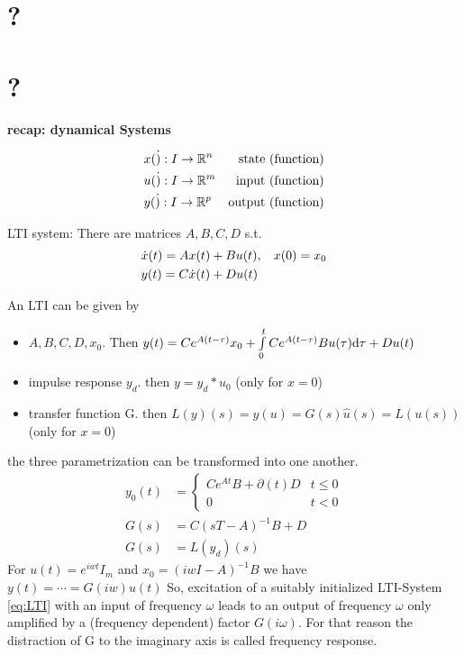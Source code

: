 \section{?}

\section{?}

\textbf{recap: dynamical Systems }

\begin{align*}
		& x(\dot ) : I \rightarrow \mathbb{R}^n & \text{state (function)}\\
		& u(\dot ) : I \rightarrow \mathbb{R}^m & \text{input (function)}\\
		& y(\dot ) : I \rightarrow \mathbb{R}^p & \text{output (function)}
\end{align*}

LTI system: There are matrices $A,B,C,D$ s.t. 
\begin{align}
	\label{eq:LTI}
	& \dot{x}(t)=A x(t) + B u(t), \hspace{2ex} x(0)=x_0\\
	& y(t)=C \dot{x}(t) + D u(t)
\end{align}


An LTI can be given by
\begin{itemize}
	\item  $A,B,C,D, x_0$. Then $y(t)= C e^{A(t-\tau)} x_0 + \int\limits_0^t C e^{A(t-\tau)}  B u(\tau) \mathrm{d} \tau + D u(t)$\item impulse response $y_d$. then $y=y_d * u_0$ (only for $x=0$)
	\item transfer function G. then $L(y)(s)=\hat{y}(u)= G(s)\hat{u}(s)=L(u(s))$ (only for $x=0$)
\end{itemize}

the three parametrization can be transformed into one another. 
\begin{align*}
	y_0(t) & = \left\{ \begin{array}{ll}
			C e^{At}B+ \partial (t) D & t \leq 0 \\
			0	& t<0
	\end{array} \right. \\
	G(s) & = C(sT-A)^{-1} B+D \\
	G(s) & = L(y_d)(s)
\end{align*}
For $u(t)=e^{iwt}I_m$ and $x_0=(iwI-A)^{-1}B$ we have $y(t)= \cdots = G(iw)u(t)$ 
So, excitation of a suitably initialized LTI-System \ref{eq:LTI} with an input of frequency $\omega$ leads to an output of frequency $\omega$ only amplified by a (frequency dependent) factor $G( i \omega) $. For that reason the distraction of G to the imaginary axis is called frequency response.


